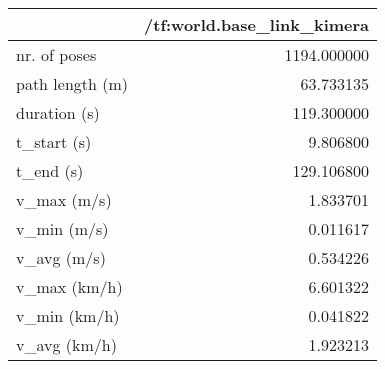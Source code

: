 \begin{tabular}{lr}
\toprule
{} &  /tf:world.base\_link\_kimera \\
\midrule
nr. of poses    &                 1194.000000 \\
path length (m) &                   63.733135 \\
duration (s)    &                  119.300000 \\
t\_start (s)     &                    9.806800 \\
t\_end (s)       &                  129.106800 \\
v\_max (m/s)     &                    1.833701 \\
v\_min (m/s)     &                    0.011617 \\
v\_avg (m/s)     &                    0.534226 \\
v\_max (km/h)    &                    6.601322 \\
v\_min (km/h)    &                    0.041822 \\
v\_avg (km/h)    &                    1.923213 \\
\bottomrule
\end{tabular}
